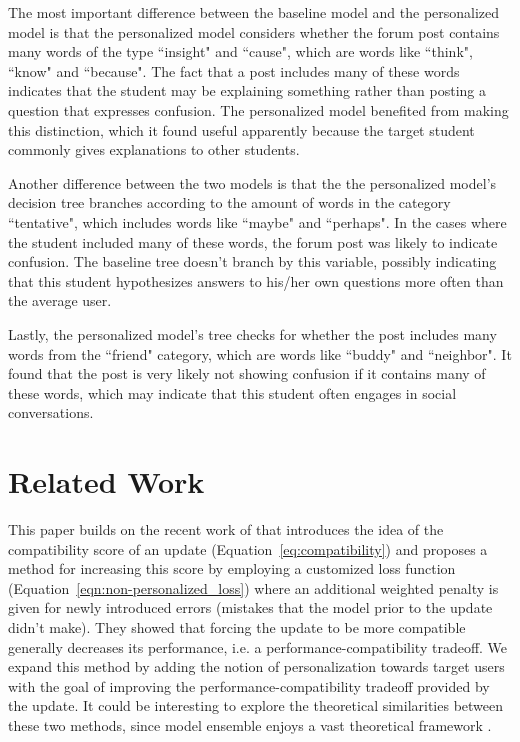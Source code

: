 \documentclass[letterpaper]{article}
\theoremstyle{definition}
\begin{document}
The most important difference between the baseline model and the personalized model is that the personalized model considers whether the forum post contains many words of the type ``insight" and ``cause", which are words like ``think", ``know" and ``because".
The fact that a post includes many of these words indicates that the student may be explaining something rather than posting a question that expresses confusion.
The personalized model benefited from making this distinction, which it found useful apparently because the target student commonly gives explanations to other students.

Another difference between the two models is that the  the personalized model's decision tree branches according to the amount of words in the category ``tentative", which includes words like ``maybe" and ``perhaps". In the cases where the student included many of these words, the forum post was likely to indicate confusion.
The baseline tree doesn't branch by this variable, possibly indicating that this student hypothesizes answers to his/her own questions more often than the average user.

Lastly, the personalized model's tree checks for whether the post includes many words from the ``friend" category, which are words like ``buddy" and ``neighbor". It found that the post is very likely not showing confusion if it contains many of these words, which may indicate that this student often engages in social conversations.
\section{Related Work}

This paper builds on the recent work of \citet{bansal2019updates} that introduces the idea of the compatibility score of an update (Equation~\ref{eq:compatibility}) and proposes a method for increasing this score by employing a customized loss function (Equation~\ref{eqn:non-personalized_loss}) where an additional weighted penalty is given for newly introduced errors (mistakes that the model prior to the update didn't make). They showed that forcing the update to be more compatible generally decreases its performance, i.e. a performance-compatibility tradeoff. We expand this method by adding the notion of personalization towards target users with the goal of improving the performance-compatibility tradeoff provided by the update. %
It could be interesting to explore the theoretical similarities between these two methods, since model ensemble enjoys a vast theoretical framework \cite{freund1996experiments}.
\end{document}
